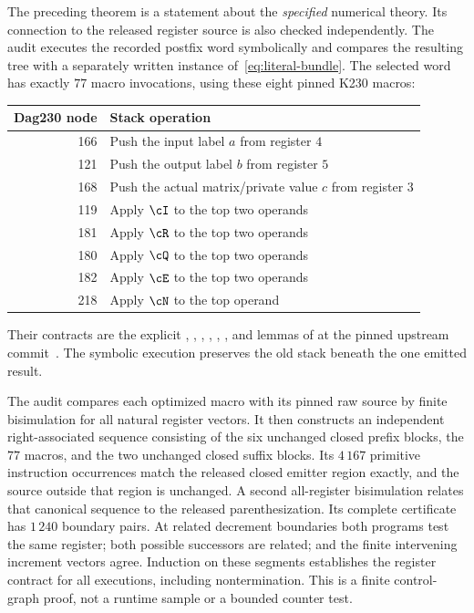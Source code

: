 The preceding theorem is a statement about the \emph{specified}
numerical theory.  Its connection to the released register source is
also checked independently.  The audit
 executes the recorded postfix word
symbolically and compares the resulting tree with a separately written
instance of~\eqref{eq:literal-bundle}.  The selected word has exactly
$77$ macro invocations, using these eight pinned K230 macros:
\begin{center}
\begin{tabular}{@{}rl@{}}
\toprule
\textbf{Dag230 node} & \textbf{Stack operation}\\
\midrule
166 & Push the input label $a$ from register $4$\\
121 & Push the output label $b$ from register $5$\\
168 & Push the actual matrix/private value $c$ from register $3$\\
119 & Apply $\cI$ to the top two operands\\
181 & Apply $\cR$ to the top two operands\\
180 & Apply $\cQ$ to the top two operands\\
182 & Apply $\cE$ to the top two operands\\
218 & Apply $\cN$ to the top operand\\
\bottomrule
\end{tabular}
\end{center}
Their contracts are the explicit , ,
, , , ,
 and  lemmas of  at the
pinned upstream commit~\cite{k230}.  The symbolic execution preserves
the old stack beneath the one emitted result.

The audit compares each optimized macro with its pinned raw source by
finite bisimulation for all natural register vectors.  It then constructs
an independent right-associated sequence consisting of the six unchanged
closed prefix blocks, the $77$ macros, and the two unchanged closed suffix
blocks.  Its $4\,167$ primitive instruction occurrences match the released
closed emitter region exactly, and the source outside that region is
unchanged.  A second all-register bisimulation relates that canonical
sequence to the released parenthesization.  Its complete certificate has
$1\,240$ boundary pairs.  At related decrement boundaries both programs
test the same register; both possible successors are related; and the
finite intervening increment vectors agree.  Induction on these segments
establishes the register contract for all executions, including
nontermination.  This is a finite control-graph proof, not a runtime
sample or a bounded counter test.

